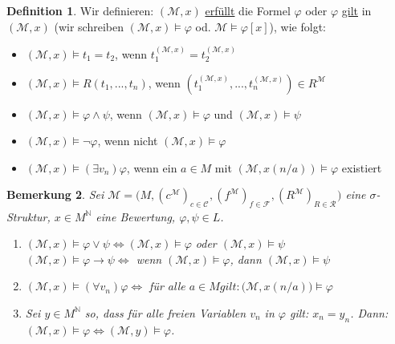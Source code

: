 \documentclass{article}
\theoremstyle{definition}
\newtheorem{dfn}{Definition}[section]
\theoremstyle{plain}
\newtheorem{bem}[dfn]{Bemerkung}
\newcommand{\m}[1]{\mathcal{#1}}
\newcommand{\struc}[3]{\big(#1, (c^{#2})_{c \in \m{C}_{#3}}, (f^{#2})_{f \in \m{F}_{#3}}, (R^{#2})_{R \in \m{R}_{#3}}\big)}
\begin{document}
    \begin{dfn}
        Wir definieren: $ (\m{M}, x) $ \underline{erfüllt} die Formel $ \varphi $ oder $ \varphi $ \underline{gilt} in $ (\m{M}, x) $ (wir schreiben $ (\m{M}, x) \models \varphi $ od. $ \m{M} \models \varphi[x] $), wie folgt:
        \begin{itemize}
            \item $ (\m{M}, x) \models t_1 = t_2 $, wenn $ t^{(\m{M}, x)}_1 = t^{(\m{M}, x)}_2 $
            \item $ (\m{M}, x) \models R(t_1, ..., t_n) $, wenn $ (t_1^{(\m{M}, x)}, ..., t_n^{(\m{M}, x)}) \in R^\m{M} $
            \item $ (\m{M}, x) \models \varphi \land \psi $, wenn $ (\m{M}, x) \models \varphi $ und $ (\m{M}, x) \models \psi $
            \item $ (\m{M}, x) \models \neg \varphi $, wenn nicht $ (\m{M}, x) \models \varphi $
            \item $ (\m{M}, x) \models (\exists v_n) \varphi $, wenn ein $ a \in M $ mit $ (\m{M}, x(n/a)) \models \varphi $ existiert
        \end{itemize}
    \end{dfn}

    \begin{bem}
        Sei $ \m{M} = \struc{M}{\m{M}}{} $ eine $ \sigma $-Struktur, $ x \in M^{\mathbb{N}} $ eine Bewertung, $\varphi, \psi \in L $.
        \begin{enumerate}
            \item $ (\m{M}, x) \models \varphi \lor \psi \Leftrightarrow (\m{M}, x) \models \varphi $ oder $ (\m{M}, x) \models \psi $\\
            $ (\m{M}, x) \models \varphi \rightarrow \psi \Leftrightarrow $ wenn $ (\m{M}, x) \models \varphi $, dann $ ( \m{M}, x) \models \psi $
            \item $ (\m{M}, x) \models (\forall v_n) \varphi \Leftrightarrow $ für alle $ a \in M gilt: \big(\m{M}, x(n/a)\big) \models \varphi $
            \item Sei $ y \in M^{\mathbb{N}} $ so, dass für alle freien Variablen $ v_n $ in $ \varphi $ gilt: $ x_n = y_n $.
            Dann: $ (\m{M}, x) \models \varphi \Leftrightarrow (\m{M}, y ) \models \varphi $. \label{itm:freie-variablen-gleich}
        \end{enumerate}
    \end{bem}
\end{document}
